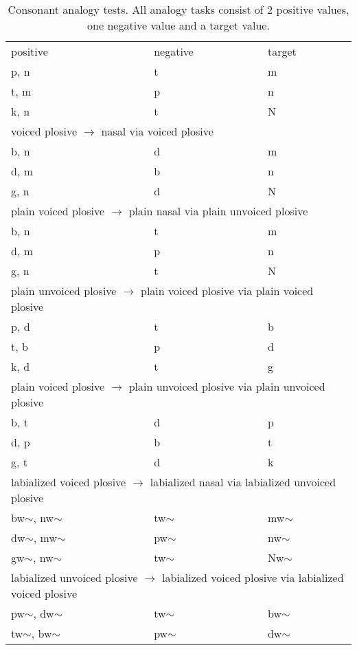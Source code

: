 \documentclass[6pt]{article}
\begin{document}
\begin{longtable}{ l | l | l }

\caption{Consonant analogy tests. All analogy tasks consist of 2 positive values, one negative value and a target value.}
\centering
\tiny
\hline \multicolumn{3}{l}{voiceless plosive $\rightarrow$ nasal via unvoiced plosive}\\  \hline
positive & negative & target \\ \hline
p, n & t & m \\
t, m & p & n \\
k, n & t & N \\ 
 \hline \multicolumn{3}{l}{voiced plosive $\rightarrow$ nasal via voiced plosive}\\  \hline
b, n & d & m \\
d, m & b & n \\
g, n & d & N \\
 \hline \multicolumn{3}{l}{plain voiced plosive $\rightarrow$ plain nasal via plain unvoiced plosive}\\  \hline
b, n & t & m \\
d, m & p & n \\
g, n & t & N \\
 \hline \multicolumn{3}{l}{plain unvoiced plosive $\rightarrow$ plain voiced plosive via plain voiced plosive}\\  \hline
p, d & t & b \\
t, b & p & d \\
k, d & t & g \\
 \hline \multicolumn{3}{l}{plain voiced plosive $\rightarrow$ plain unvoiced plosive via plain unvoiced plosive}\\  \hline
b, t & d & p \\
d, p & b & t \\
g, t & d & k \\
 \hline \multicolumn{3}{l}{labialized voiced plosive $\rightarrow$  labialized nasal via labialized unvoiced plosive}\\  \hline
bw$\sim$, nw$\sim$ & tw$\sim$ & mw$\sim$ \\
dw$\sim$, mw$\sim$ & pw$\sim$ & nw$\sim$ \\
gw$\sim$, nw$\sim$ & tw$\sim$ & Nw$\sim$ \\
 \hline \multicolumn{3}{l}{labialized unvoiced plosive $\rightarrow$ labialized voiced plosive via labialized voiced plosive}\\  \hline
pw$\sim$, dw$\sim$ & tw$\sim$ & bw$\sim$ \\
tw$\sim$, bw$\sim$ & pw$\sim$ & dw$\sim$ \\

\end{longtable}
\end{document}
